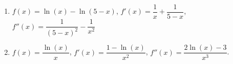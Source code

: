 \documentclass{ximera}
\begin{document}
\begin{enumerate}
\setcounter{enumi}{\value{HW}}

\item\label{logcurvesketchfirst}  $f(x) = \ln(x) - \ln(5-x)$,  $f'(x) = \dfrac{1}{x} + \dfrac{1}{5-x}$, $f''(x) = \dfrac{1}{(5-x)^2} - \dfrac{1}{x^2}$

\smallskip

\item\label{logcurvesketchlast}  $f(x) = \dfrac{\ln(x)}{x}$, $f'(x) = \dfrac{1 - \ln(x)}{x^2}$, $f''(x) = \dfrac{2 \ln(x) - 3}{x^3}$.


\setcounter{HW}{\value{enumi}}
\end{enumerate}
\end{document}
